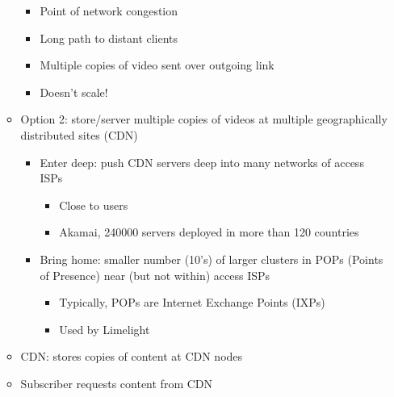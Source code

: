 \begin{itemize}
\begin{itemize}
\begin{itemize}
          \item Point of network congestion

          \item Long path to distant clients

          \item Multiple copies of video sent over outgoing link

          \item Doesn't scale!

        \end{itemize}

      \item Option 2: store/server multiple copies of videos at multiple geographically distributed sites (CDN)

        \begin{itemize}

          \item Enter deep: push CDN servers deep into many networks of access ISPs

            \begin{itemize}

              \item Close to users

              \item Akamai, 240000 servers deployed in more than 120 countries

            \end{itemize}

          \item Bring home: smaller number (10's) of larger clusters in POPs (Points of Presence) near (but not within) access ISPs

            \begin{itemize}

              \item Typically, POPs are Internet Exchange Points (IXPs)

              \item Used by Limelight

            \end{itemize}

        \end{itemize}

      \item CDN: stores copies of content at CDN nodes

      \item Subscriber requests content from CDN


\end{itemize}
\end{itemize}
